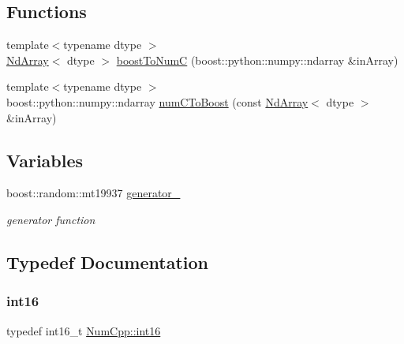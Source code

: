 \subsection*{Functions}
\begin{DoxyCompactItemize}
\item 
{\footnotesize template$<$typename dtype $>$ }\\\mbox{\hyperlink{class_num_cpp_1_1_nd_array}{Nd\+Array}}$<$ dtype $>$ \mbox{\hyperlink{namespace_num_cpp_a5868211230328aff1a1d017a75aca374}{boost\+To\+NumC}} (boost\+::python\+::numpy\+::ndarray \&in\+Array)
\item 
{\footnotesize template$<$typename dtype $>$ }\\boost\+::python\+::numpy\+::ndarray \mbox{\hyperlink{namespace_num_cpp_a7006d46972c46ff7817ec6faa5b408f8}{num\+C\+To\+Boost}} (const \mbox{\hyperlink{class_num_cpp_1_1_nd_array}{Nd\+Array}}$<$ dtype $>$ \&in\+Array)
\end{DoxyCompactItemize}
\subsection*{Variables}
\begin{DoxyCompactItemize}
\item 
boost\+::random\+::mt19937 \mbox{\hyperlink{namespace_num_cpp_a89b9a902970eecc0ec84aa6d29711fe6}{generator\+\_\+}}
\begin{DoxyCompactList}\small\item\em generator function \end{DoxyCompactList}\end{DoxyCompactItemize}


\subsection{Typedef Documentation}
\mbox{\label{namespace_num_cpp_a4cf8a907fdc869d71f98ca69efb7ea09}} 
\subsubsection{\texorpdfstring{int16}{int16}}
{\footnotesize\ttfamily typedef int16\+\_\+t \mbox{\hyperlink{namespace_num_cpp_a4cf8a907fdc869d71f98ca69efb7ea09}{Num\+Cpp\+::int16}}}

\mbox{\label{namespace_num_cpp_acf3eb1592f8b248ff0a236634864633c}} 
